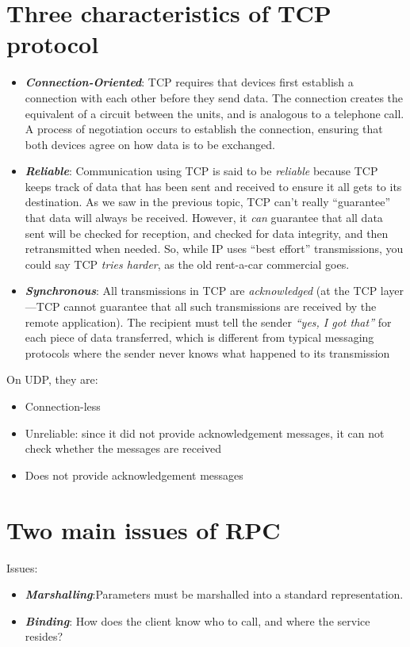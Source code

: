 \documentclass[11pt,a4paper]{report}
\begin{document}
  	\section{Three characteristics of TCP protocol}
  	\begin{itemize}
  		\item \textbf{\emph{Connection-Oriented}}: TCP requires that devices first establish a connection with each other before they send data. The connection creates the equivalent of a circuit between the units, and is analogous to a telephone call. A process of negotiation occurs to establish the connection, ensuring that both devices agree on how data is to be exchanged.
  		\item \textbf{\emph{Reliable}}: Communication using TCP is said to be \emph{reliable} because TCP keeps track of data that has been sent and received to ensure it all gets to its destination. As we saw in the previous topic, TCP can't really “guarantee” that data will always be received. However, it \emph{can} guarantee that all data sent will be checked for reception, and checked for data integrity, and then retransmitted when needed. So, while IP uses “best effort” transmissions, you could say TCP \emph{tries harder}, as the old rent-a-car commercial goes.
  		\item \textbf{\emph{Synchronous}}: All transmissions in TCP are \emph{acknowledged} (at the TCP layer—TCP cannot guarantee that all such transmissions are received by the remote application). The recipient must tell the sender \emph{“yes, I got that”} for each piece of data transferred, which is different from typical messaging protocols where the sender never knows what happened to its transmission
  	\end{itemize}
  	On UDP, they are:
  	\begin{itemize}
  		\item Connection-less
  		\item Unreliable: since it did not provide acknowledgement messages, it can not check whether the messages are received
  		\item Does not provide acknowledgement messages
  	\end{itemize}
  	
  	\section{Two main issues of RPC}
  	Issues:
  	\begin{itemize}
  		\item \textbf{\emph{Marshalling}}:Parameters must be marshalled into a standard representation.
  		\item \textbf{\emph{Binding}}: How does the client know who to call, and where the service resides?
  	\end{itemize}
  	
\end{document}
